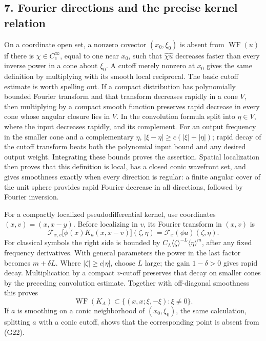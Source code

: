 \documentclass[
  11pt,
]{article}
\begin{document}
\subsection{7. Fourier directions and the precise kernel
relation}\label{fourier-directions-and-the-precise-kernel-relation}

On a coordinate open set, a nonzero covector \((x_0,\xi_0)\) is absent
from \(\operatorname{WF}(u)\) if there is \(\chi\in C_c^\infty\), equal
to one near \(x_0\), such that \(\widehat{\chi u}\) decreases faster
than every inverse power in a cone about \(\xi_0\). A cutoff merely
nonzero at \(x_0\) gives the same definition by multiplying with its
smooth local reciprocal. The basic cutoff estimate is worth spelling
out. If a compact distribution has polynomially bounded Fourier
transform and that transform decreases rapidly in a cone \(V\), then
multiplying by a compact smooth function preserves rapid decrease in
every cone whose angular closure lies in \(V\). In the convolution
formula split into \(\eta\in V\), where the input decreases rapidly, and
its complement. For an output frequency in the smaller cone and a
complementary \(\eta\), \(|\xi-\eta|\geq c(|\xi|+|\eta|)\); rapid decay
of the cutoff transform beats both the polynomial input bound and any
desired output weight. Integrating these bounds proves the assertion.
Spatial localization then proves that this definition is local, has a
closed conic wavefront set, and gives smoothness exactly when every
direction is regular: a finite angular cover of the unit sphere provides
rapid Fourier decrease in all directions, followed by Fourier inversion.

For a compactly localized pseudodifferential kernel, use coordinates
\((x,v)=(x,x-y)\). Before localizing in \(v\), its Fourier transform in
\((x,v)\) is \[
\mathcal F_{x,v}\big[\phi(x)K_a(x,x-v)\big](\zeta,\eta)
=\mathcal F_x(\phi a)(\zeta,\eta).
\tag{G21}
\] For classical symbols the right side is bounded by
\(C_L\langle\zeta\rangle^{-L}\langle\eta\rangle^m\), after any fixed
frequency derivatives. With general parameters the power in the last
factor becomes \(m+\delta L\). Where \(|\zeta|\geq c|\eta|\), choose
\(L\) large; the gain \(1-\delta>0\) gives rapid decay. Multiplication
by a compact \(v\)-cutoff preserves that decay on smaller cones by the
preceding convolution estimate. Together with off-diagonal smoothness
this proves \[
\operatorname{WF}(K_A)\subset
\{(x,x;\xi,-\xi):\xi\ne0\}.
\tag{G22}
\] If \(a\) is smoothing on a conic neighborhood of \((x_0,\xi_0)\), the
same calculation, splitting \(a\) with a conic cutoff, shows that the
corresponding point is absent from (G22).
\end{document}
